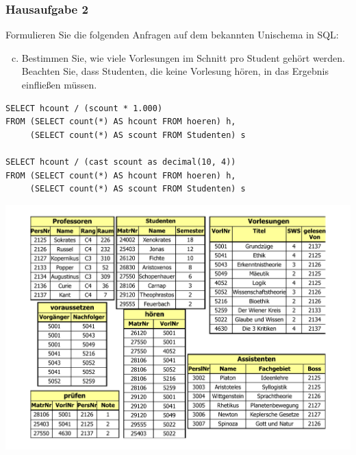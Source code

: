 \begin{frame}[fragile]
	\frametitle{Hausaufgabe 2}
	\vspace{0.5cm}

	\begin{multicols}{2}
		Formulieren Sie die folgenden Anfragen auf dem bekannten Unischema in SQL:
		\begin{enumerate}[a)]
			\setcounter{enumi}{2}
			\item Bestimmen Sie, wie viele Vorlesungen im Schnitt pro Student gehört werden. 
				  Beachten Sie, dass Studenten, die keine Vorlesung hören, in das Ergebnis einfließen müssen.
		\end{enumerate}
		\begin{verbatim}
SELECT hcount / (scount * 1.000)
FROM (SELECT count(*) AS hcount FROM hoeren) h,
     (SELECT count(*) AS scount FROM Studenten) s

SELECT hcount / (cast scount as decimal(10, 4))
FROM (SELECT count(*) AS hcount FROM hoeren) h,
     (SELECT count(*) AS scount FROM Studenten) s
		\end{verbatim}
		\vfill\columnbreak

		\begin{center}
			\includegraphics[height=.6\paperheight]{../img/uni.pdf}
		\end{center}
	\end{multicols}
\end{frame}


